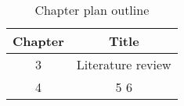\begin{table}[h!]
\centering
\begin{tabular}{cc}
{Chapter} & {Title} \\ \midrule
{3} & {Literature review} \\
{4} & {}
{5}
{6}
\end{tabular}
\caption{Chapter plan outline}
\label{table:1}
\end{table}